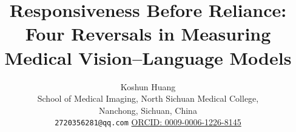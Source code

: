 \documentclass[11pt]{article}
\title{Responsiveness Before Reliance:\\[2pt]
\large Four Reversals in Measuring Medical Vision--Language Models}
\author{Koshun Huang\\[2pt]
\small School of Medical Imaging, North Sichuan Medical College,\\
\small Nanchong, Sichuan, China\\[1pt]
\small \texttt{2720356281@qq.com}\quad
\href{https://orcid.org/0009-0006-1226-8145}{ORCID: 0009-0006-1226-8145}}
\date{}
\begin{document}
\maketitle

\begin{abstract}

\end{abstract}










\FloatBarrier



\appendix

\end{document}
